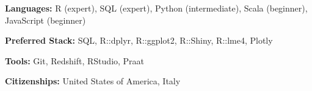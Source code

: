\documentclass[9pt]{article}
\newenvironment{changemargin}[2]{%
  \begin{list}{}{%
    \setlength{\topsep}{0pt}%
    \setlength{\leftmargin}{#1}%
    \setlength{\rightmargin}{#2}%
    \setlength{\listparindent}{\parindent}%
    \setlength{\itemindent}{\parindent}%
    \setlength{\parsep}{\parskip}%
  }%
  \item[]}{\end{list}
}
\newenvironment{body} {
	\vspace*{-16pt}
	\begin{changemargin}{-0.25in}{-0.5in}
  }	
	{\end{changemargin}
}
\begin{document}
\begin{body}
	\vspace{14pt}
	
	\textbf{Languages:} R (expert), SQL (expert), Python (intermediate), Scala (beginner), JavaScript (beginner)\\
	\medskip

	\textbf{Preferred Stack:} SQL, R::dplyr, R::ggplot2,  R::Shiny, R::lme4, Plotly\\
	\medskip
	
	\textbf{Tools:} Git, Redshift, RStudio, Praat\\
	\medskip
	
	\textbf{Citizenships:} United States of America, Italy\\
	\medskip

\end{body}
\end{document}
